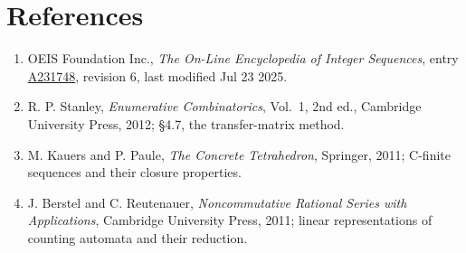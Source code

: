 \documentclass[11pt]{article}
\theoremstyle{definition}
\begin{document}
\section{References}

\begin{enumerate}

\item OEIS Foundation Inc., \emph{The On-Line Encyclopedia of Integer Sequences}, entry \href{https://oeis.org/A231748}{A231748}, revision 6, last modified Jul 23 2025.

\item R. P. Stanley, \emph{Enumerative Combinatorics}, Vol.~1, 2nd ed., Cambridge University Press, 2012; \S4.7, the transfer-matrix method.

\item M. Kauers and P. Paule, \emph{The Concrete Tetrahedron}, Springer, 2011; C-finite sequences and their closure properties.

\item J. Berstel and C. Reutenauer, \emph{Noncommutative Rational Series with Applications}, Cambridge University Press, 2011; linear representations of counting automata and their reduction.

\end{enumerate}
\end{document}
